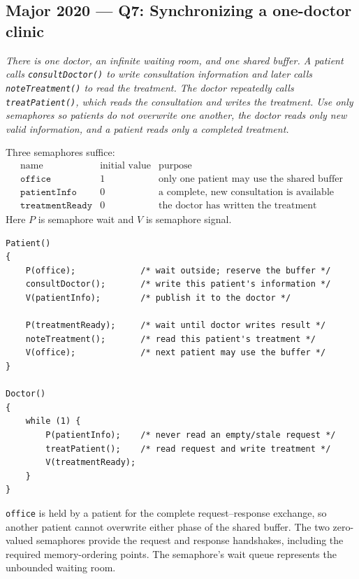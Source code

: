 \documentclass[11pt,a4paper]{article}
\begin{document}
\subsection*{Major 2020 --- Q7: Synchronizing a one-doctor clinic}

\emph{There is one doctor, an infinite waiting room, and one shared buffer.
A patient calls \texttt{consultDoctor()} to write consultation information
and later calls \texttt{noteTreatment()} to read the treatment.  The doctor
repeatedly calls \texttt{treatPatient()}, which reads the consultation and
writes the treatment.  Use only semaphores so patients do not overwrite one
another, the doctor reads only new valid information, and a patient reads
only a completed treatment.}

Three semaphores suffice:
\[
\begin{array}{c|c|l}
\mbox{name} & \mbox{initial value} & \mbox{purpose}\\ \hline
\texttt{office} & 1 & \mbox{only one patient may use the shared buffer}\\
\texttt{patientInfo} & 0 & \mbox{a complete, new consultation is available}\\
\texttt{treatmentReady} & 0 & \mbox{the doctor has written the treatment}
\end{array}
\]
Here \(P\) is semaphore wait and \(V\) is semaphore signal.

\begin{verbatim}
Patient()
{
    P(office);             /* wait outside; reserve the buffer */
    consultDoctor();       /* write this patient's information */
    V(patientInfo);        /* publish it to the doctor */

    P(treatmentReady);     /* wait until doctor writes result */
    noteTreatment();       /* read this patient's treatment */
    V(office);             /* next patient may use the buffer */
}

Doctor()
{
    while (1) {
        P(patientInfo);    /* never read an empty/stale request */
        treatPatient();    /* read request and write treatment */
        V(treatmentReady);
    }
}
\end{verbatim}

\texttt{office} is held by a patient for the complete request--response
exchange, so another patient cannot overwrite either phase of the shared
buffer.  The two zero-valued semaphores provide the request and response
handshakes, including the required memory-ordering points.  The semaphore's
wait queue represents the unbounded waiting room.
\end{document}
